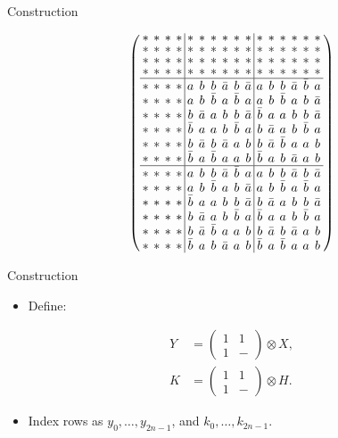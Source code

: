 \documentclass{beamer}
\begin{document}
\begin{frame}{Construction}
  
  \[
    \arraycolsep=2.0pt\def\arraystretch{0.75}
    \left(
      \begin{array}{cccc|cccccc|cccccc}
        *&*&*&*&*&*&*&*&*&*&*&*&*&*&*&*\\
        *&*&*&*&*&*&*&*&*&*&*&*&*&*&*&*\\
        *&*&*&*&*&*&*&*&*&*&*&*&*&*&*&*\\
        *&*&*&*&*&*&*&*&*&*&*&*&*&*&*&*\\ \hline
        *&*&*&*&a&b&b&\bar{a}&b&\bar{a}&a&b&b&\bar{a}&\bar{b}&a\\
        *&*&*&*&a&b&\bar{b}&a&\bar{b}&a&a&b&\bar{b}&a&b&\bar{a}\\
        *&*&*&*&b&\bar{a}&a&b&b&\bar{a}&\bar{b}&a&a&b&b&\bar{a}\\
        *&*&*&*&\bar{b}&a&a&b&\bar{b}&a&b&\bar{a}&a&b&\bar{b}&a\\
        *&*&*&*&b&\bar{a}&b&\bar{a}&a&b&b&\bar{a}&\bar{b}&a&a&b\\
        *&*&*&*&\bar{b}&a&\bar{b}&a&a&b&\bar{b}&a&b&\bar{a}&a&b\\ \hline
        *&*&*&*&a&b&b&\bar{a}&\bar{b}&a&a&b&b&\bar{a}&b&\bar{a}\\
        *&*&*&*&a&b&\bar{b}&a&b&\bar{a}&a&b&\bar{b}&a&\bar{b}&a\\
        *&*&*&*&\bar{b}&a&a&b&b&\bar{a}&b&\bar{a}&a&b&b&\bar{a}\\
        *&*&*&*&b&\bar{a}&a&b&\bar{b}&a&\bar{b}&a&a&b&\bar{b}&a\\
        *&*&*&*&b&\bar{a}&\bar{b}&a&a&b&b&\bar{a}&b&\bar{a}&a&b\\
        *&*&*&*&\bar{b}&a&b&\bar{a}&a&b&\bar{b}&a&\bar{b}&a&a&b\\
      \end{array}
    \right)
  \]

\end{frame}

\begin{frame}{Construction}

  \begin{itemize}
    \item Define:
  \end{itemize}

  \begin{align*}
    Y &= \left( \begin{smallmatrix} 1&1\\1&- \end{smallmatrix} \right) \otimes X,\\
    K &= \left( \begin{smallmatrix} 1&1\\1&- \end{smallmatrix} \right) \otimes H.
  \end{align*}

  \begin{itemize}
    \item Index rows as $y_0, \dots, y_{2n-1}$, and $k_0, \dots, k_{2n-1}$.
  \end{itemize}
  
\end{frame}
\end{document}

